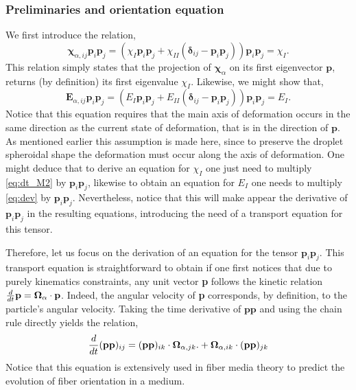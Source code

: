 \subsubsection{Preliminaries and orientation equation}
We first introduce the relation,
\begin{equation}
    \bm\chi_{\alpha,ij} \textbf{p}_i\textbf{p}_j
    = 
    (
        \chi_I \textbf{p}_i\textbf{p}_j
        + \chi_{II} (\bm\delta_{ij} - \textbf{p}_i\textbf{p}_j)
    ) \textbf{p}_i\textbf{p}_j
    = \chi_I.
    \label{eq:chi_I_def}
\end{equation} 
This relation simply states that the projection of $\bm\chi_\alpha$ on its first eigenvector $\textbf{p}$, returns (by definition) its first eigenvalue $\chi_I$. 
Likewise, we might show that, 
\begin{equation}
    \textbf{E}_{\alpha,ij} \textbf{p}_i\textbf{p}_j
    = 
    (
        E_I \textbf{p}_i\textbf{p}_j
        + E_{II} (\bm\delta_{ij} - \textbf{p}_i\textbf{p}_j)
    ) \textbf{p}_i\textbf{p}_j
    = E_I.
    \label{eq:E_I_def}
\end{equation} 
Notice that this equation requires that the main axis of deformation occurs in the same direction as the current state of deformation, that is in the direction of $\textbf{p}$. 
As mentioned earlier this assumption is made here, since to preserve the droplet spheroidal shape the deformation must occur along the axis of deformation. 
One might deduce that to derive an equation for $\chi_I$ one just need to multiply \ref{eq:dt_M2} by $\textbf{p}_i \textbf{p}_j$, likewise to obtain an equation for $E_I$ one needs to multiply \ref{eq:dev} by $\textbf{p}_i \textbf{p}_j$. 
Nevertheless, notice that this will make appear the derivative of $\textbf{p}_i \textbf{p}_j$ in the resulting equations, introducing the need of a transport equation for this tensor. 

Therefore, let us focus on the derivation of an equation for the tensor  $\textbf{p}_i \textbf{p}_j$. 
This transport equation is straightforward to obtain if one first notices that due to purely kinematics constraints, any unit vector \textbf{p} follows the kinetic relation $\frac{d}{dt} \textbf{p} = \bm\Omega_\alpha \cdot \textbf{p}$.
Indeed, the angular velocity of \textbf{p} corresponds, by definition, to the particle's angular velocity. 
Taking the time derivative of $\textbf{pp}$ and using the chain rule directly yields the relation, 
\begin{equation}
    \ddt (\textbf{pp})_{ij}
    = 
    (\textbf{pp})_{ik}\cdot\bm\Omega_{\alpha,jk}. 
    +\bm\Omega_{\alpha,ik}\cdot (\textbf{pp})_{jk}
    \label{eq:dt_pp}
\end{equation}
Notice that this equation is extensively used in fiber media theory to predict the evolution of fiber orientation in a medium. 

